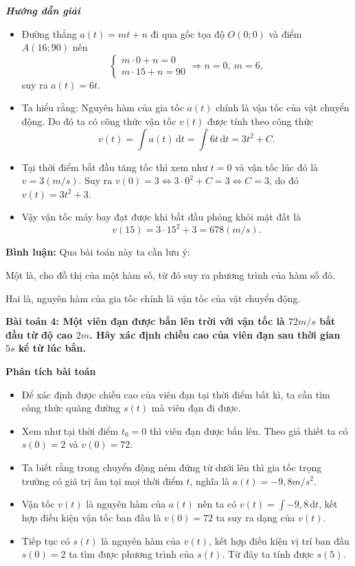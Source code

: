\documentclass[12pt,a4paper]{article}
\newcommand{\dd}{\,\mathrm{d}}
\newcommand{\analysis}{\noindent\raisebox{0.15ex}{\rule{1.6ex}{1.6ex}}\hspace{4pt}\textbf{Phân tích bài toán}\par}
\newcommand{\solution}{\begin{center}\textbf{\textit{Hướng dẫn giải}}\end{center}\par}
\newcommand{\commenthead}{\textbf{Bình luận:} Qua bài toán này ta cần lưu ý:\par}
\begin{document}
\solution
\begin{itemize}
\item Đường thẳng $a(t)=mt+n$ đi qua gốc tọa độ $O(0;0)$ và điểm $A(16;90)$ nên
\[
\begin{cases}m\cdot0+n=0\\m\cdot15+n=90\end{cases}
\Longrightarrow n=0,\ m=6,
\]
suy ra $a(t)=6t$.
\item Ta hiểu rằng: Nguyên hàm của gia tốc $a(t)$ chính là vận tốc của vật chuyển động. Do
đó ta có công thức vận tốc $v(t)$ được tính theo công thức
\[
v(t)=\int a(t)\dd t=\int6t\dd t=3t^2+C.
\]
\item Tại thời điểm bắt đầu tăng tốc thì xem như $t=0$ và vận tốc lúc đó là $v=3(m/s)$.
Suy ra $v(0)=3\Leftrightarrow3\cdot0^2+C=3\Leftrightarrow C=3$, do đó
$v(t)=3t^2+3$.
\item Vậy vận tốc máy bay đạt được khi bắt đầu phóng khỏi mặt đất là
\[
v(15)=3\cdot15^2+3=678(m/s).
\]
\end{itemize}

\begin{commentbox}\commenthead
Một là, cho đồ thị của một hàm số, từ đó suy ra phương trình của hàm số đó.

Hai là, nguyên hàm của gia tốc chính là vận tốc của vật chuyển động.

\end{commentbox}\textbf{Bài toán 4: Một viên đạn được bắn lên trời với vận tốc là $72m/s$ bắt đầu từ độ cao $2m$. Hãy xác định chiều cao của viên đạn sau thời gian $5s$ kể từ lúc bắn.}\par\medskip
\begin{analysisbox}
\analysis
\begin{itemize}
\item Để xác định được chiều cao của viên đạn tại thời điểm bất kì, ta cần tìm công thức quãng đường $s(t)$ mà viên đạn đi được.
\item Xem như tại thời điểm $t_0=0$ thì viên đạn được bắn lên. Theo giả thiết ta có $s(0)=2$
và $v(0)=72$.
\item Ta biết rằng trong chuyển động ném đứng từ dưới lên thì gia tốc trọng trường có giá trị
âm tại mọi thời điểm $t$, nghĩa là $a(t)=-9,8m/s^2$.
\item Vận tốc $v(t)$ là nguyên hàm của $a(t)$ nên ta có $v(t)=\int-9,8\dd t$, kết hợp điều kiện vận
tốc ban đầu là $v(0)=72$ ta suy ra dạng của $v(t)$.
\item Tiếp tục có $s(t)$ là nguyên hàm của $v(t)$, kết hợp điều kiện vị trí ban đầu $s(0)=2$ ta tìm
được phương trình của $s(t)$. Từ đây ta tính được $s(5)$.
\end{itemize}
\end{analysisbox}
\end{document}
